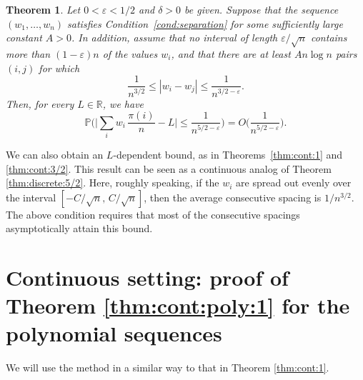 \documentclass[reqno]{amsart}
\newcommand\R{{\mathbb{R}}}
\renewcommand\P{{\mathbb{P}}}
\newcommand\eps{{\varepsilon}}
\theoremstyle{plain}
\newtheorem{theorem}{Theorem}[section]
\theoremstyle{definition}
\begin{document}
\begin{theorem}\label{thm:cont:5/2}
Let $0 < \eps < 1/2$ and $\delta > 0$ be given.  
Suppose that the sequence $(w_1, \ldots, w_n)$ satisfies Condition~\ref{cond:separation} for some sufficiently large constant $A > 0$.  
In addition, assume that no interval of length $\eps / \sqrt{n}$ contains more than $(1 - \eps)n$ of the values $w_i$, and that there are at least $A n \log n$ pairs $(i, j)$ for which  
\[
\frac{1}{n^{3/2}} \le |w_i - w_j| \le \frac{1}{n^{3/2 - \eps}}.
\]
Then, for every $L \in \R$, we have  
\[
\P \Big( \Big|\sum_i w_i \, \frac{\pi(i)}{n} - L \Big| \le \frac{1}{n^{5/2 - \eps}} \Big) = O\Big( \frac{1}{n^{5/2 - \eps}} \Big).
\]
\end{theorem}


We can also obtain an $L$-dependent bound, as in Theorems~\ref{thm:cont:1} and \ref{thm:cont:3/2}. This result can be seen as a continuous analog of Theorem \ref{thm:discrete:5/2}. Here, roughly speaking, if the $w_{i}$ are spread out evenly over the interval $[-C/\sqrt{n},\, C/\sqrt{n}]$, then the average consecutive spacing is $1/n^{3/2}$. The above condition requires that most of the consecutive spacings asymptotically attain this bound.



\section{Continuous setting: proof of Theorem \ref{thm:cont:poly:1} for the polynomial sequences}\label{sect:poly}

We will use the method 
in a similar way to that in Theorem \ref{thm:cont:1}. 
\end{document}
